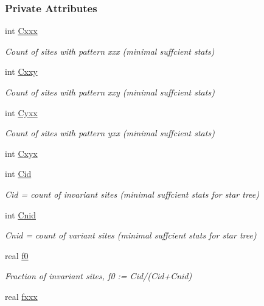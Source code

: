 \subsubsection*{\-Private \-Attributes}
\begin{DoxyCompactItemize}
\item 
int \hyperlink{classFCFN3_a70ede8e738b72b8bea0ba6eb5e44e884}{\-Cxxx}
\begin{DoxyCompactList}\small\item\em \-Count of sites with pattern xxx (minimal suffcient stats) \end{DoxyCompactList}\item 
int \hyperlink{classFCFN3_a1a5c9deec90452588e2f57f5291881b0}{\-Cxxy}
\begin{DoxyCompactList}\small\item\em \-Count of sites with pattern xxy (minimal suffcient stats) \end{DoxyCompactList}\item 
int \hyperlink{classFCFN3_a4e3aae643d4c68030d916df7ac71b538}{\-Cyxx}
\begin{DoxyCompactList}\small\item\em \-Count of sites with pattern yxx (minimal suffcient stats) \end{DoxyCompactList}\item 
int \hyperlink{classFCFN3_a60144493a83a2555c774cf7dfa4c9ec0}{\-Cxyx}
\item 
int \hyperlink{classFCFN3_ad9e40b33eda0764e3a289dd6be269be3}{\-Cid}
\begin{DoxyCompactList}\small\item\em \-Cid = count of invariant sites (minimal suffcient stats for star tree) \end{DoxyCompactList}\item 
int \hyperlink{classFCFN3_a8ef5d6f9df7caa72a6dd86d65c22eb3c}{\-Cnid}
\begin{DoxyCompactList}\small\item\em \-Cnid = count of variant sites (minimal suffcient stats for star tree) \end{DoxyCompactList}\item 
real \hyperlink{classFCFN3_a7555e90b5424a3989f51e1afbb76a36e}{f0}
\begin{DoxyCompactList}\small\item\em \-Fraction of invariant sites, f0 \-:= \-Cid/(\-Cid+\-Cnid) \end{DoxyCompactList}\item 
real \hyperlink{classFCFN3_ae3655e04a444781c13aac711f1672785}{fxxx}

\end{DoxyCompactItemize}
